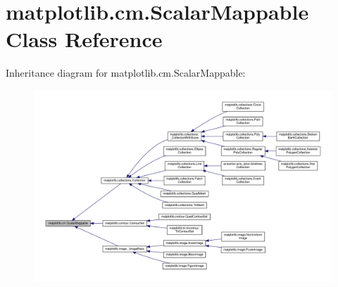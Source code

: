 \hypertarget{classmatplotlib_1_1cm_1_1ScalarMappable}{}\section{matplotlib.\+cm.\+Scalar\+Mappable Class Reference}
\label{classmatplotlib_1_1cm_1_1ScalarMappable}


Inheritance diagram for matplotlib.\+cm.\+Scalar\+Mappable\+:
\nopagebreak
\begin{figure}[H]
\begin{center}
\leavevmode
\includegraphics[width=350pt]{classmatplotlib_1_1cm_1_1ScalarMappable__inherit__graph}
\end{center}
\end{figure}
